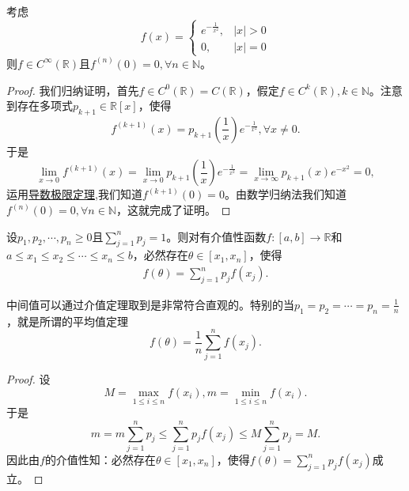 \documentclass[../../main.tex]{subfiles}%
\begin{document}
\begin{example}[\,\,经典光滑函数]\label{example:经典光滑函数}
考虑
\[
f(x)=
\begin{cases}
e^{-\frac{1}{x^2}}, &|x|>0 \\
0, &|x| = 0
\end{cases}
\]
则\(f\in C^{\infty}(\mathbb{R})\)且\(f^{(n)}(0)=0,\forall n\in\mathbb{N}\)。
\end{example}
\begin{proof}

我们归纳证明，首先\(f\in C^{0}(\mathbb{R}) = C(\mathbb{R})\)，假定\(f\in C^{k}(\mathbb{R}),k\in\mathbb{N}\)。注意到存在多项式\(p_{k + 1}\in\mathbb{R}[x]\)，使得
\[
f^{(k + 1)}(x)=p_{k + 1}\left(\frac{1}{x}\right)e^{-\frac{1}{x^2}},\forall x\neq0.
\]
于是
\[
\lim_{x\rightarrow0}f^{(k + 1)}(x)=\lim_{x\rightarrow0}p_{k + 1}\left(\frac{1}{x}\right)e^{-\frac{1}{x^2}}=\lim_{x\rightarrow\infty}p_{k + 1}(x)e^{-x^2}=0,
\]
运用\hyperref[theorem:导数极限定理]{导数极限定理},我们知道\(f^{(k + 1)}(0)=0\)。由数学归纳法我们知道\(f^{(n)}(0)=0,\forall n\in\mathbb{N}\)，这就完成了证明。

\end{proof}

\begin{theorem}[连续函数中间值定理]\label{theorem:连续函数中间值定理}
设\(p_1,p_2,\cdots,p_n\geqslant0\)且\(\sum_{j = 1}^{n}p_j = 1\)。则对有介值性函数\(f:[a,b]\to\mathbb{R}\)和\(a\leqslant x_1\leqslant x_2\leqslant\cdots\leqslant x_n\leqslant b\)，必然存在\(\theta\in[x_1,x_n]\)，使得
\begin{align*}
f(\theta)=\sum_{j = 1}^{n}p_jf(x_j).
\end{align*}
\end{theorem}
\begin{note}
中间值可以通过介值定理取到是非常符合直观的。特别的当\(p_1 = p_2=\cdots=p_n=\frac{1}{n}\)，就是所谓的平均值定理
\[
f(\theta)=\frac{1}{n}\sum_{j = 1}^{n}f(x_j).
\]
\end{note}
\begin{proof}

设
\[
M=\max_{1\leqslant i\leqslant n}f(x_i),m=\min_{1\leqslant i\leqslant n}f(x_i).
\]
于是
\[
m = m\sum_{j = 1}^{n}p_j\leqslant\sum_{j = 1}^{n}p_jf(x_j)\leqslant M\sum_{j = 1}^{n}p_j = M.
\]
因此由\(f\)的介值性知：必然存在\(\theta\in[x_1,x_n]\)，使得$f(\theta)=\sum_{j = 1}^{n}p_jf(x_j)$成立。

\end{proof}
\end{document}
